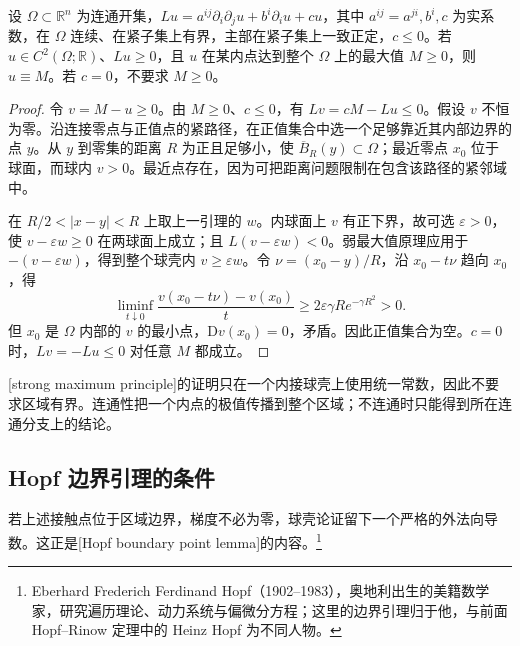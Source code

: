 \begin{theorem}[强最大值原理]\label{g3:thm:strong-maximum-classical}
	设 \(\Omega\subset\mathbb R^n\) 为连通开集，\(Lu=a^{ij}\partial_i\partial_ju+b^i\partial_i u+cu\)，其中 \(a^{ij}=a^{ji},b^i,c\) 为实系数，在 \(\Omega\) 连续、在紧子集上有界，主部在紧子集上一致正定，\(c\le0\)。若 \(u\in C^2(\Omega;\mathbb R)\)、\(Lu\ge0\)，且 \(u\) 在某内点达到整个 \(\Omega\) 上的最大值 \(M\ge0\)，则 \(u\equiv M\)。若 \(c=0\)，不要求 \(M\ge0\)。
\end{theorem}
\begin{proof}
	令 \(v=M-u\ge0\)。由 \(M\ge0\)、\(c\le0\)，有 \(Lv=cM-Lu\le0\)。假设 \(v\) 不恒为零。沿连接零点与正值点的紧路径，在正值集合中选一个足够靠近其内部边界的点 \(y\)。从 \(y\) 到零集的距离 \(R\) 为正且足够小，使 \(\overline B_R(y)\subset\Omega\)；最近零点 \(x_0\) 位于球面，而球内 \(v>0\)。最近点存在，因为可把距离问题限制在包含该路径的紧邻域中。

	在 \(R/2<|x-y|<R\) 上取上一引理的 \(w\)。内球面上 \(v\) 有正下界，故可选 \(\varepsilon>0\)，使 \(v-\varepsilon w\ge0\) 在两球面上成立；且 \(L(v-\varepsilon w)<0\)。弱最大值原理应用于 \(-(v-\varepsilon w)\)，得到整个球壳内 \(v\ge\varepsilon w\)。令 \(\nu=(x_0-y)/R\)，沿 \(x_0-t\nu\) 趋向 \(x_0\)，得
	\[
		\liminf_{t\downarrow0}\frac{v(x_0-t\nu)-v(x_0)}t
		\ge2\varepsilon\gamma R e^{-\gamma R^2}>0.
	\]
	但 \(x_0\) 是 \(\Omega\) 内部的 \(v\) 的最小点，\(\mathrm Dv(x_0)=0\)，矛盾。因此正值集合为空。\(c=0\) 时，\(Lv=-Lu\le0\) 对任意 \(M\) 都成立。
\end{proof}

[strong maximum principle]的证明只在一个内接球壳上使用统一常数，因此不要求区域有界。连通性把一个内点的极值传播到整个区域；不连通时只能得到所在连通分支上的结论。

\subsection{Hopf 边界引理的条件}
\label{g3:subsec:1207:03}
若上述接触点位于区域边界，梯度不必为零，球壳论证留下一个严格的外法向导数。这正是[Hopf boundary point lemma]的内容。\footnote{Eberhard Frederich Ferdinand Hopf（1902--1983），奥地利出生的美籍数学家，研究遍历理论、动力系统与偏微分方程；这里的边界引理归于他，与前面 Hopf--Rinow 定理中的 Heinz Hopf 为不同人物。}

